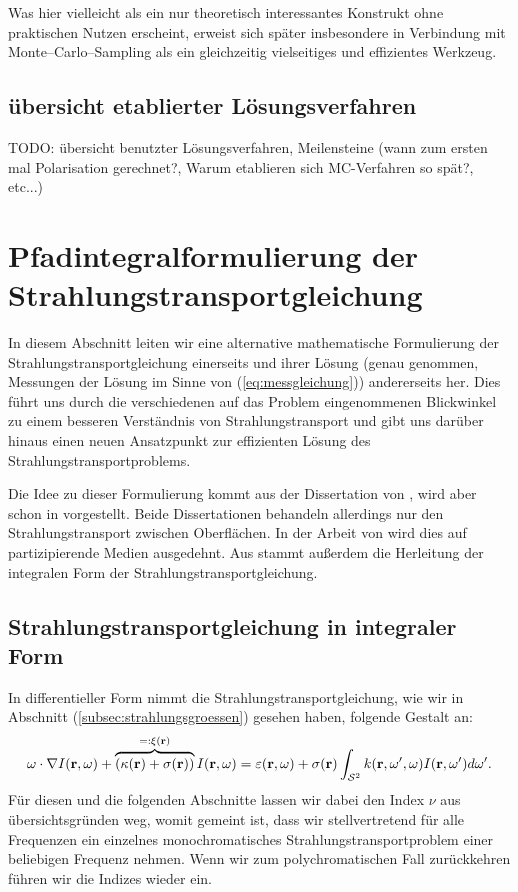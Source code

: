 	Was hier vielleicht als ein nur theoretisch interessantes Konstrukt ohne praktischen Nutzen erscheint, erweist sich später insbesondere in Verbindung mit Monte--Carlo--Sampling als ein gleichzeitig vielseitiges und effizientes Werkzeug.	
	
	
	\section{übersicht etablierter Lösungsverfahren}
	TODO: übersicht benutzter Lösungsverfahren, Meilensteine (wann zum ersten mal Polarisation gerechnet?, Warum etablieren sich MC-Verfahren so spät?, etc...)
		
	\chapter{Pfadintegralformulierung der Strahlungstransportgleichung}\label{chapter:path_radiative_transfer}
	In diesem Abschnitt leiten wir eine alternative mathematische Formulierung der Strahlungstransportgleichung einerseits und ihrer Lösung (genau genommen, Messungen der Lösung im Sinne von (\ref{eq:messgleichung})) andererseits her. Dies führt uns durch die verschiedenen auf das Problem eingenommenen Blickwinkel zu einem besseren Verständnis von Strahlungstransport und gibt uns darüber hinaus einen neuen Ansatzpunkt zur effizienten Lösung des Strahlungstransportproblems.
	
	Die Idee zu dieser Formulierung kommt aus der Dissertation von \citet{Veach:1997p9136}, wird aber schon in \citep{Arvo:1995p9257} vorgestellt. Beide Dissertationen behandeln allerdings nur den Strahlungstransport zwischen Oberflächen. In der Arbeit von \citet{Pauly:2000p5705} wird dies auf partizipierende Medien ausgedehnt. Aus \citep{Arvo:1993p9035} stammt außerdem die Herleitung der integralen Form der Strahlungstransportgleichung.
	
	
	\section{Strahlungstransportgleichung in integraler Form}
	In differentieller Form nimmt die Strahlungstransportgleichung, wie wir in Abschnitt (\ref{subsec:strahlungsgroessen}) gesehen haben, folgende Gestalt an:
		\begin{equation}
			\omega \cdot \nabla I(\mathbf{r},\omega)+\overbrace{\left(\kappa(\mathbf{r})+\sigma(\mathbf{r})\right)}^{=:\xi(\mathbf{r})}I(\mathbf{r},\omega)=\varepsilon(\mathbf{r},\omega)+\sigma(\mathbf{r}) \int_{\mathcal{S}^2} k(\mathbf{r},\omega',\omega)I(\mathbf{r},\omega') d\omega'.
			\label{eq:diff.STG}
		\end{equation}
	Für diesen und die folgenden Abschnitte lassen wir dabei den Index $\nu$ aus übersichtsgründen weg, womit gemeint ist, dass wir stellvertretend für alle Frequenzen ein einzelnes monochromatisches Strahlungstransportproblem einer beliebigen Frequenz nehmen. Wenn wir zum polychromatischen Fall zurückkehren führen wir die Indizes wieder ein.
	

